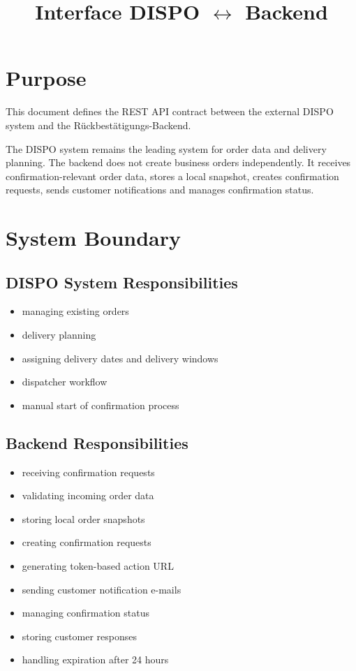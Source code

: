\documentclass[a4paper,11pt]{article}
\title{Interface DISPO \texorpdfstring{$\leftrightarrow$}{↔} Backend}
\author{}
\date{}
\begin{document}
	
	\maketitle
	
	\section{Purpose}
	
	This document defines the REST API contract between the external DISPO system and the Rückbestätigungs-Backend.
	
	The DISPO system remains the leading system for order data and delivery planning.  
	The backend does not create business orders independently. It receives confirmation-relevant order data, stores a local snapshot, creates confirmation requests, sends customer notifications and manages confirmation status.
	
	\section{System Boundary}
	
	\subsection{DISPO System Responsibilities}
	
	\begin{itemize}
		\item managing existing orders
		\item delivery planning
		\item assigning delivery dates and delivery windows
		\item dispatcher workflow
		\item manual start of confirmation process
	\end{itemize}
	
	\subsection{Backend Responsibilities}
	
	\begin{itemize}
		\item receiving confirmation requests
		\item validating incoming order data
		\item storing local order snapshots
		\item creating confirmation requests
		\item generating token-based action URL
		\item sending customer notification e-mails
		\item managing confirmation status
		\item storing customer responses
		\item handling expiration after 24 hours
	\end{itemize}
	
\end{document}
